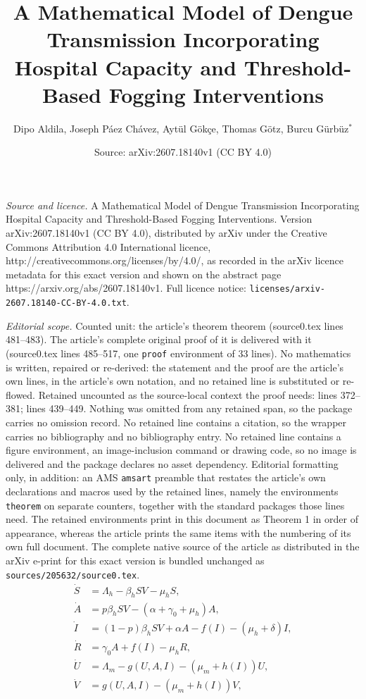 \documentclass[10pt,a4paper]{amsart}
\title{A Mathematical Model of Dengue Transmission Incorporating Hospital Capacity and Threshold-Based Fogging Interventions}
\author{Dipo Aldila, Joseph P\'aez Ch\'avez, Aytül Gökçe, Thomas Götz, Burcu Gürbüz$^*$}
\date{Source: arXiv:2607.18140v1 (CC BY 4.0)}
\begin{document}
\maketitle

\noindent\emph{Source and licence.} A Mathematical Model of Dengue Transmission Incorporating Hospital Capacity and Threshold-Based Fogging Interventions. Version arXiv:2607.18140v1 (CC BY 4.0), distributed by arXiv under the Creative Commons Attribution 4.0 International licence, http://creativecommons.org/licenses/by/4.0/, as recorded in the arXiv licence metadata for this exact version and shown on the abstract page https://arxiv.org/abs/2607.18140v1. Full licence notice: \texttt{licenses/arxiv-2607.18140-CC-BY-4.0.txt}.\par\smallskip

\noindent\textit{Editorial scope.} Counted unit: the article's theorem theorem (source0.tex lines 481--483). The article's complete original proof of it is delivered with it (source0.tex lines 485--517, one \texttt{proof} environment of 33 lines). No mathematics is written, repaired or re-derived: the statement and the proof are the article's own lines, in the article's own notation, and no retained line is substituted or re-flowed.  Retained uncounted as the source-local context the proof needs: lines 372--381; lines 439--449.  Nothing was omitted from any retained span, so the package carries no omission record.  No retained line contains a citation, so the wrapper carries no bibliography and no bibliography entry.  No retained line contains a figure environment, an image-inclusion command or drawing code, so no image is delivered and the package declares no asset dependency.  Editorial formatting only, in addition: an AMS \texttt{amsart} preamble that restates the article's own declarations and macros used by the retained lines, namely the environments \texttt{theorem} on separate counters, together with the standard packages those lines need.  The retained environments print in this document as Theorem 1 in order of appearance, whereas the article prints the same items with the numbering of its own full document.  The complete native source of the article as distributed in the arXiv e-print for this exact version is bundled unchanged as \texttt{sources/205632/source0.tex}.
\begin{equation}\label{model}
    \begin{aligned}
        \dot{S} &= \Lambda_h - \beta_h S V - \mu_h S,  \\
    \dot{A} &= p \beta_h S V - \left(\alpha + \gamma_0 + \mu_h\right)A,  \\
    \dot{I} &= (1-p)\beta_h S V + \alpha A - f(I) - (\mu_h + \delta)I,  \\
    \dot{R} &= \gamma_0 A + f(I) - \mu_h R, \\
    \dot{U} &= \Lambda_m - g(U,A,I) - (\mu_m + h(I))U,  \\
    \dot{V} &= g(U,A,I) - (\mu_m + h(I))V,
    \end{aligned}
\end{equation}
\end{document}
